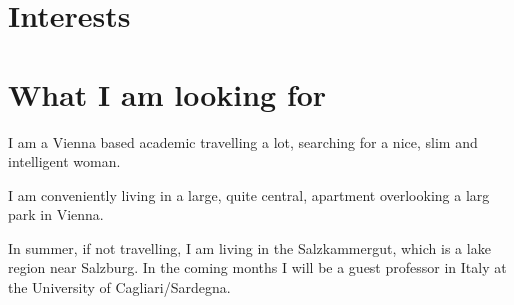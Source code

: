 \documentclass[11pt,a4paper]{moderncv}
\begin{document}
\section{Interests}
            {} {} {}    {}
      {}       {} {} {}
       {}        {} {} {}
              {}     {} {} {}

\section{What I am looking for}
I am a Vienna based academic travelling a lot, searching for a nice, slim and intelligent woman.

I am conveniently living in a large,
quite central, apartment overlooking a larg park in Vienna.

In summer, if not travelling, I am living in the Salzkammergut, which is a lake region near Salzburg.
In the coming months I will be a guest professor in Italy at the University of Cagliari/Sardegna.
\end{document}
